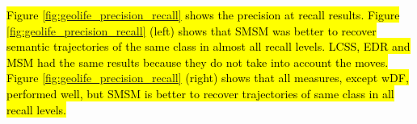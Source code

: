 \documentclass[12pt]{article}
\begin{document}
\hl{Figure {\ref{fig:geolife_precision_recall}} shows the precision at recall results. Figure {\ref{fig:geolife_precision_recall}} (left)  shows that SMSM was better to recover semantic trajectories of the same class in almost all recall levels. LCSS, EDR and MSM had the same results because they do not take into account the moves. Figure {\ref{fig:geolife_precision_recall}} (right) shows that all measures, except wDF, performed well, but SMSM is better to recover trajectories of same class in all recall levels. }
\end{document}
